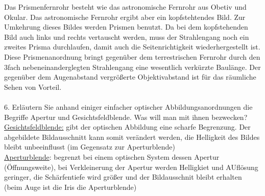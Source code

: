 Das Prismenfernrohr besteht wie das astronomische Fernrohr aus Obetiv und Okular. Das astronomische Fernrohr ergibt aber ein kopfstehtendes Bild. Zur Umkehrung dieses Bildes werden Prismen benutzt. Da bei dem kopfstehenden Bild auch links und rechts vertauscht werden, muss der Strahlengang noch ein zweites Prisma durchlaufen, damit auch die Seitenrichtigkeit wiederhergestellt ist. Diese Prismenanordnung bringt gegenüber dem terrestrischen Fernrohr durch den 3fach nebeneinanderglegten Strahlengang eine wesentlich verkürzte Baulänge. Der gegenüber dem Augenabstand vergrößerte Objektivabstand ist für das räumliche Sehen von Vorteil. \\ \\
6. Erläutern Sie anhand einiger einfacher optischer Abbildungsanordnungen die Begriffe Apertur und Gesichtsfeldblende. Was will man mit ihnen bezwecken?\\
\underline{Gesichtsfeldblende:} gibt der optischen Abbildung eine scharfe Begrenzung. Der abgebildete Bildausschnitt kann somit verändert werden, die Helligkeit des Bildes bleibt unbeeinflusst (im Gegensatz zur Aperturblende)  \\
\underline{Aperturblende}: begrenzt bei einem optischen System dessen Apertur (Öffnungsweite), bei Verkleinerung der Apertur werden Helligkiet und AUflösung geringer, die Schärfentiefe wird größer und der Bildausschnit bleibt erhalten (beim Auge ist die Iris die Aperturblende)
\begin{figure}[h]
\centering
\end{figure}

